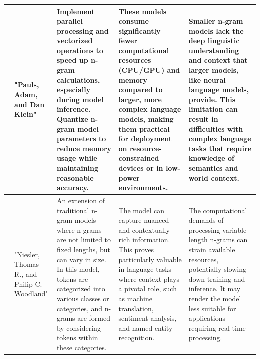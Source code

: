 \documentclass[fleqn,10pt]{thescipub} %
\begin{document}
\begin{table}
\begin{center}
\begin{tabular}{ |p{1cm}|p{2cm}|p{4cm}|p{4cm}|p{4cm}| }
\hline
[10] &  "Pauls, Adam, and Dan Klein" &  Implement parallel processing and vectorized operations to speed up n-gram calculations, especially during model inference. Quantize n-gram model parameters to reduce memory usage while maintaining reasonable accuracy. &  These models consume significantly fewer computational resources (CPU/GPU) and memory compared to larger, more complex language models, making them practical for deployment on resource-constrained devices or in low-power environments. &  Smaller n-gram models lack the deep linguistic understanding and context that larger models, like neural language models, provide. This limitation can result in difficulties with complex language tasks that require knowledge of semantics and world context.  \\
\hline
[11] &  "Niesler, Thomas R., and Philip C. Woodland" & An extension of traditional n-gram models where n-grams are not limited to fixed lengths, but can vary in size. In this model, tokens are categorized into various classes or categories, and n-grams are formed by considering tokens within these categories. &  The model can capture nuanced and contextually rich information. This proves particularly valuable in language tasks where context plays a pivotal role, such as machine translation, sentiment analysis, and named entity recognition. & The computational demands of processing variable-length n-grams can strain available resources, potentially slowing down training and inference. It may render the model less suitable for applications requiring real-time processing. \\
\hline
\end{tabular}
\end{center}
\end{table}
\end{document}
